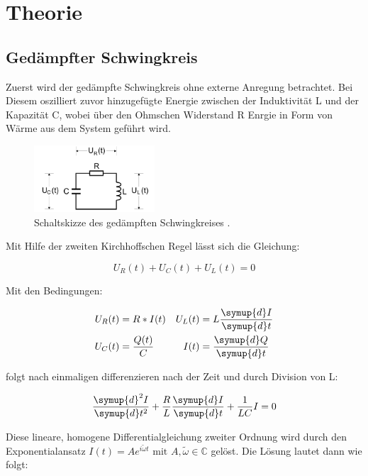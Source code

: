 \section{Theorie}
\label{sec:Theorie}

\subsection{Gedämpfter Schwingkreis}
\label{sec:Theorie_1}

Zuerst wird der gedämpfte Schwingkreis ohne externe Anregung betrachtet. 
Bei Diesem oszilliert zuvor hinzugefügte Energie zwischen der Induktivität L und der Kapazität C,
wobei über den Ohmschen Widerstand R Enrgie in Form von Wärme aus dem System geführt wird.

\begin{figure}
	\centering
    \includegraphics[width=0.4\textwidth]{content/RLC.pdf}
	\caption{Schaltskizze des gedämpften Schwingkreises \cite{v354}.}
	\label{fig:RLC}
\end{figure}

Mit Hilfe der zweiten Kirchhoffschen Regel lässt sich die Gleichung:

\begin{equation}
    \label{eqn:RLC1}
    U_R(t) + U_C(t) + U_L(t) = 0
\end{equation}

Mit den Bedingungen:

\begin{align}
    \label{eqn:RLC_relations}
        U_R(t) &= R*I(t) & U_L(t) &= L \frac{\symup{d}I}{\symup{d}t} \nonumber \\
        U_C(t) &= \frac{Q(t)}{C} & I(t) &= \frac{\symup{d}Q}{\symup{d}t} 
\end{align}

folgt nach einmaligen differenzieren nach der Zeit und durch Division von L:

\begin{equation}
    \label{eqn:RLC_dgl}
    \frac{\symup{d}^{2}I}{\symup{d}t^2} + \frac{R}{L}\frac{\symup{d}I}{\symup{d}t} + \frac{1}{LC}I = 0   
\end{equation}

Diese lineare, homogene Differentialgleichung zweiter Ordnung wird durch den Exponentialansatz 
$I(t) = A e^{i\tilde{\omega} t} \text{ mit } A, \tilde{\omega} \in \mathbb{C}$ gelöst. Die Lösung lautet dann wie folgt:

